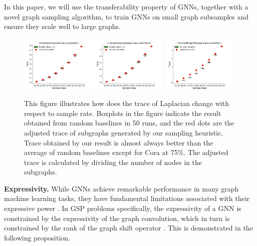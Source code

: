 In this paper, we will use the transferability property of GNNs, together with a novel graph sampling algorithm, to train GNNs on small graph subsamples and ensure they scale well to large graphs.

\begin{figure}[t]
\centering
\includegraphics[width=0.32\textwidth]{img/trace_revised/CoraGraphDataset_trace_boxplot.png}
\includegraphics[width=0.32\textwidth]{img/trace_revised/CiteseerGraphDataset_trace_boxplot.png}
\includegraphics[width=0.32\textwidth]{img/trace_revised/PubmedGraphDataset_trace_boxplot.png}
\caption{This figure illustrates how does the trace of Laplacian change with respect to sample rate. Boxplots in the figure indicate the result obtained from random baselines in 50 runs, and the red dots are the adjusted trace of subgraphs generated by our sampling heuristic. Trace obtained by our result is almost always better than the average of random baselines except for Cora at 75\%. The adjusted trace is calculated by dividing the number of nodes in the subgraphs.}
\label{fig:trace}
\end{figure}

\noindent \textbf{Expressivity.} While GNNs achieve remarkable performance in many graph machine learning tasks, they have fundamental limitations associated with their expressive power \cite{xu2018how,chen2019equivalence}. In GSP problems specifically, the expressivity of a GNN is constrained by the expressivity of the graph convolution, which in turn is constrained by the rank of the graph shift operator \cite{ruiz2024spectral}. This is demonstrated in the following proposition.

